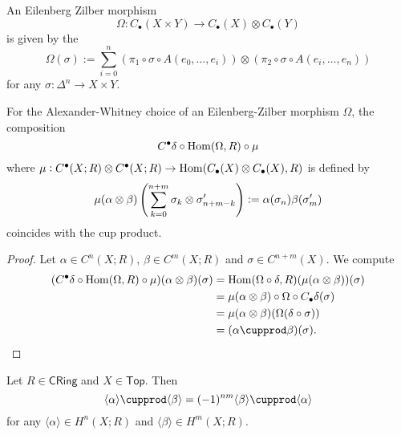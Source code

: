 \begin{theorem}
	\label{thm:AWF}
	An Eilenberg Zilber morphism 
	\begin{equation*}
		\Omega : C_\bullet(X \times Y) \to C_\bullet(X) \otimes C_\bullet(Y)
	\end{equation*}
	\noindent is given by the 
	\begin{equation}
		\Omega(\sigma) := \sum_{i = 0}^n (\pi_1 \circ \sigma \circ A(e_0,\dots,e_i)) \otimes (\pi_2 \circ \sigma \circ A(e_i,\dots,e_n)) 
	\end{equation}
	\noindent for any $\sigma : \Delta^n \to X \times Y$.
\end{theorem}

\begin{proposition}
	For the Alexander-Whitney choice of an Eilenberg-Zilber morphism $\Omega$, the composition
	\begin{equation*}
		C^\bullet \delta \circ \operatorname{Hom}(\Omega,R) \circ \mu
	\end{equation*}
	\noindent where $\mu : C^\bullet(X;R) \otimes C^\bullet(X;R) \to \operatorname{Hom}(C_\bullet(X) \otimes C_\bullet(X),R)$ is defined by
	\begin{equation*}
		\mu(\alpha \otimes \beta)\del[4]{\sum_{k = 0}^{n + m} \sigma_k \otimes \sigma'_{n + m - k}} := \alpha(\sigma_n)\beta(\sigma'_m)
	\end{equation*}
	\noindent coincides with the cup product.
\end{proposition}

\begin{proof}
	Let $\alpha \in C^n(X;R)$, $\beta \in C^m(X;R)$ and $\sigma \in C^{n + m}(X)$. We compute
	\begin{align*}
		(C^\bullet \delta \circ \Hom(\Omega,R) \circ \mu)(\alpha \otimes \beta)(\sigma) &= \Hom(\Omega \circ \delta,R)(\mu(\alpha \otimes \beta))(\sigma)\\
		&= \mu(\alpha \otimes \beta)\circ \Omega \circ C_\bullet\delta(\sigma)\\
		&= \mu(\alpha \otimes \beta)(\Omega(\delta \circ \sigma))\\
		&= (\alpha \cupprod \beta)(\sigma).
	\end{align*}
\end{proof}

\begin{theorem}
	Let $R \in \mathsf{CRing}$ and $X \in \mathsf{Top}$. Then
	\begin{equation*}
		\langle \alpha \rangle \cupprod \langle \beta \rangle = (-1)^{nm} \langle \beta \rangle \cupprod \langle \alpha \rangle
	\end{equation*}
	\noindent for any $\langle \alpha \rangle \in H^n(X;R)$ and $\langle \beta \rangle \in H^m(X;R)$.
\end{theorem}

